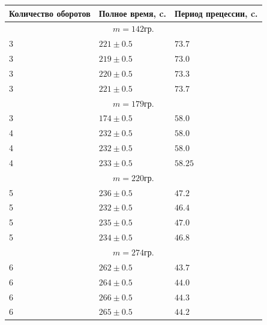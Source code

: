 \documentclass[a4paper, 12pt]{article}
\begin{document}
\begin{table}
    \centering
    \begin{tabular}{|l|l|l|}
    \hline
    Количество оборотов & Полное время, c. & Период прецессии, c.   \\ \hline
    \multicolumn{3}{|c|}{$m = 142 гр.$}                     \\ \hline
    3   &   $221 \pm 0.5$   &   $73.7$                      \\ \hline
    3   &   $219 \pm 0.5$   &   $73.0$                      \\ \hline
    3   &   $220 \pm 0.5$   &   $73.3$                      \\ \hline
    3   &   $221 \pm 0.5$   &   $73.7$                      \\ \hline

    \multicolumn{3}{|c|}{$m = 179 гр.$}                     \\ \hline
    3   &   $174 \pm 0.5$   &   $58.0 $                     \\ \hline
    4   &   $232 \pm 0.5$   &   $58.0 $                     \\ \hline
    4   &   $232 \pm 0.5$   &   $58.0 $                     \\ \hline
    4   &   $233 \pm 0.5$   &   $58.25$                     \\ \hline
    
    \multicolumn{3}{|c|}{$m = 220 гр.$}                     \\ \hline
    5   &   $236 \pm 0.5$   &   $47.2$                      \\ \hline
    5   &   $232 \pm 0.5$   &   $46.4$                      \\ \hline
    5   &   $235 \pm 0.5$   &   $47.0$                      \\ \hline
    5   &   $234 \pm 0.5$   &   $46.8$                      \\ \hline

    \multicolumn{3}{|c|}{$m = 274 гр.$}                     \\ \hline
    6   &   $262 \pm 0.5$   &   $43.7$                      \\ \hline
    6   &   $264 \pm 0.5$   &   $44.0$                      \\ \hline
    6   &   $266 \pm 0.5$   &   $44.3$                      \\ \hline
    6   &   $265 \pm 0.5$   &   $44.2$                      \\ \hline
    

\end{tabular}
\end{table}
\end{document}
